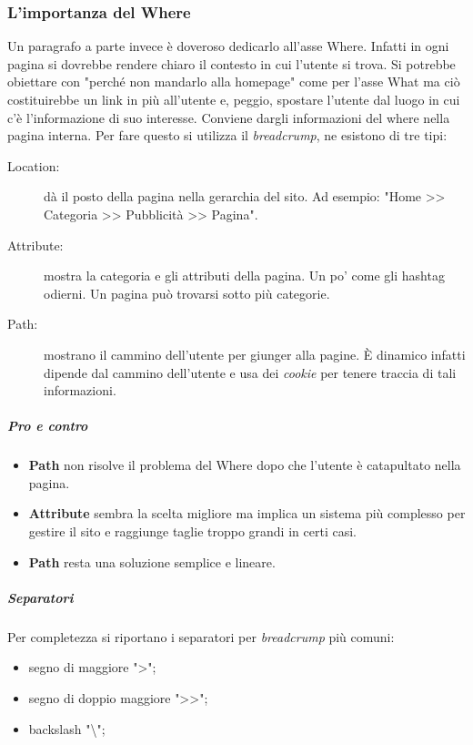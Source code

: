 		\subsubsection{L'importanza del Where}
			Un paragrafo a parte invece è doveroso dedicarlo all'asse Where. Infatti in ogni pagina si dovrebbe rendere chiaro il contesto in cui l'utente si trova. Si potrebbe obiettare con "perché non mandarlo alla homepage" come per l'asse What ma ciò costituirebbe un link in più all'utente e, peggio, spostare l'utente dal luogo in cui c'è l'informazione di suo interesse. Conviene dargli informazioni del where nella pagina interna.
				Per fare questo si utilizza il \emph{breadcrump}, ne esistono di tre tipi:
				\begin{description}
					\item[Location:] dà il posto della pagina nella gerarchia del sito. Ad esempio: "Home >> Categoria >> Pubblicità >> Pagina".
					\item[Attribute:] mostra la categoria e gli attributi della pagina. Un po' come gli hashtag odierni. Un pagina può trovarsi sotto più categorie.
					\item[Path:] mostrano il cammino dell'utente per giunger alla pagine. È dinamico infatti dipende dal cammino dell'utente e usa dei \emph{cookie} per tenere traccia di tali informazioni.
				\end{description}
				
				\subparagraph{Pro e contro}
					\begin{itemize}
						\item \textbf{Path} non risolve il problema del Where dopo che l'utente è catapultato nella pagina.
						\item \textbf{Attribute} sembra la scelta migliore ma implica un sistema più complesso per gestire il sito e raggiunge taglie troppo grandi in certi casi.
						\item \textbf{Path} resta una soluzione semplice e lineare.
					\end{itemize}
				
				\subparagraph{Separatori}
					Per completezza si riportano i separatori per \emph{breadcrump} più comuni:
					\begin{itemize}
						\item segno di maggiore ">";
						\item segno di doppio maggiore ">>";
						\item backslash "\textbackslash";
					\end{itemize}
				